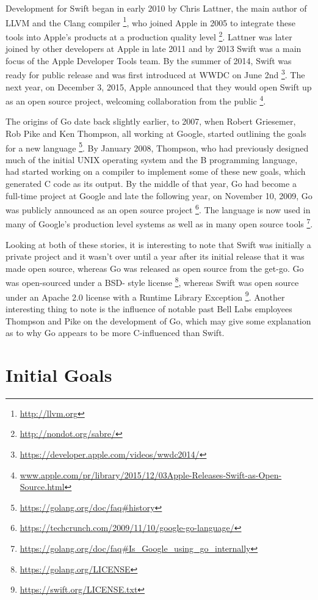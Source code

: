 \documentclass[letterpaper]{article}
\begin{document}
Development for Swift began in early 2010 by Chris Lattner, the main author of LLVM and the Clang compiler \footnote{\url{http://llvm.org}}, who joined Apple in 2005 to integrate these tools into Apple’s products at a production quality level \footnote{\url{http://nondot.org/sabre/}}. Lattner was later joined by other developers at Apple in late 2011 and by 2013 Swift was a main focus of the Apple Developer Tools team. By the summer of 2014, Swift was ready for public release and was first introduced at WWDC on June 2nd \footnote{\url{https://developer.apple.com/videos/wwdc2014/}}. The next year, on December 3, 2015, Apple announced that they would open Swift up as an open source project, welcoming collaboration from the public \footnote{\url{www.apple.com/pr/library/2015/12/03Apple-Releases-Swift-as-Open-
Source.html}}.

The origins of Go date back slightly earlier, to 2007, when Robert Griesemer, Rob Pike and Ken Thompson, all working at Google, started outlining the goals for a new language \footnote{\url{https://golang.org/doc/faq#history}}. By January 2008, Thompson, who had previously designed much of the initial UNIX operating system and the B programming language, had started working on a compiler to implement some of these new goals, which generated C code as its output. By the middle of that year, Go had become a full-time project at Google and late the following year, on November 10, 2009, Go was publicly announced as an open source project \footnote{\url{https://techcrunch.com/2009/11/10/google-go-language/}}. The language is now used in many of Google’s production level systems as well as in many open source tools \footnote{\url{https://golang.org/doc/faq#Is_Google_using_go_internally}}.

Looking at both of these stories, it is interesting to note that Swift was initially a private project and it wasn’t over until a year after its initial release that it was made open source, whereas Go was released as open source from the get-go. Go was open-sourced under a BSD- style license \footnote{\url{https://golang.org/LICENSE}}, whereas Swift was open source under an Apache 2.0 license with a Runtime Library Exception \footnote{\url{https://swift.org/LICENSE.txt}}. Another interesting thing to note is the influence of notable past Bell Labs employees Thompson and Pike on the development of Go, which may give some explanation as to why Go appears to be more C-influenced than Swift.

\section{Initial Goals}
\end{document}
